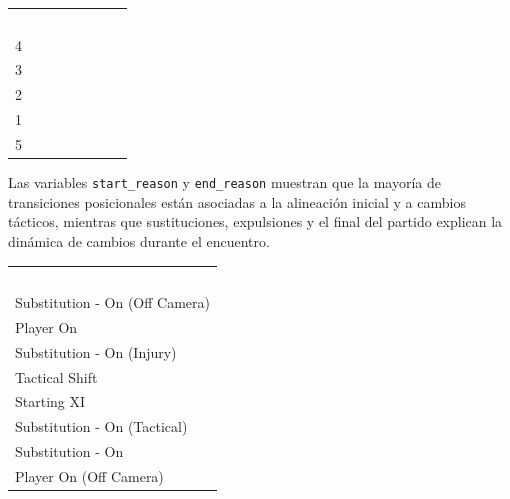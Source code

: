 \documentclass[12pt,a4paper]{article}
\newcommand{\thead}[1]{%
  \cellcolor{tableheader}\textcolor{white}{\textbf{#1}}%
}
\begin{document}
\begin{center}
\small
\begin{tabular}{lc}
\rowcolor{tableheader}
\thead{from\_period} \\

\rowcolor{tablealt} 4 \\
\rowcolor{tablerow} 3 \\
\rowcolor{tablealt} 2 \\
\rowcolor{tablerow} 1 \\
\rowcolor{tablealt} 5 \\

\end{tabular}
\end{center}

Las variables \texttt{start\_reason} y \texttt{end\_reason} muestran que la mayoría de transiciones posicionales están asociadas a la alineación inicial y a cambios tácticos, mientras que sustituciones, expulsiones y el final del partido explican la dinámica de cambios durante el encuentro.

\begin{center}
\small
\begin{tabular}{l}
\rowcolor{tableheader}
\thead{start\_reason} \\

\rowcolor{tablealt} Substitution - On (Off Camera) \\
\rowcolor{tablerow} Player On \\
\rowcolor{tablealt} Substitution - On (Injury) \\
\rowcolor{tablerow} Tactical Shift \\
\rowcolor{tablealt} Starting XI \\
\rowcolor{tablerow} Substitution - On (Tactical) \\
\rowcolor{tablealt} Substitution - On \\
\rowcolor{tablerow} Player On (Off Camera) \\

\end{tabular}
\end{center}
\end{document}
